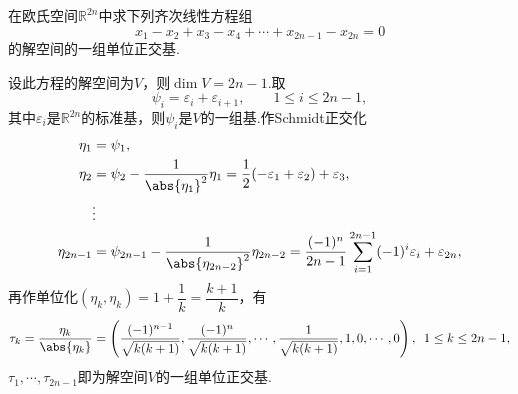 \begin{prob}[25]
	在欧氏空间$\mathbb{R}^{2n}$中求下列齐次线性方程组
	\[
		x_1-x_2+x_3-x_4+\cdots+x_{2n-1}-x_{2n}=0
	\]
	的解空间的一组单位正交基.
\end{prob}
\begin{sol}
	设此方程的解空间为$V$，则$\dim V=2n-1$.取
	\[
		\psi_i=\varepsilon_i+\varepsilon_{i+1},\qquad 1\le i\le 2n-1,
	\]
	其中$\varepsilon_i$是$\mathbb{R}^{2n}$的标准基，则$\psi_i$是$V$的一组基.作Schmidt正交化
	\begin{align*}
		\eta_1      & =\psi_1,                                                                                                                          \\
		\eta_2      & =\psi_2-\frac{1}{\abs{\eta_1}^2}\eta_1=\frac{1}{2}(-\varepsilon_1+\varepsilon_2)+\varepsilon_3,                                   \\
		            & \vdots                                                                                                                            \\
		\eta_{2n-1} & =\psi_{2n-1}-\frac{1}{\abs{\eta_{2n-2}}^2}\eta_{2n-2}=\frac{(-1)^{n}}{2n-1}\sum_{i=1}^{2n-1}(-1)^i\varepsilon_i+\varepsilon_{2n},
	\end{align*}
	再作单位化$(\eta_k,\eta_k)=1+\dfrac{1}{k}=\dfrac{k+1}{k}$，有
	\[
		\tau_k=\frac{\eta_k}{\abs{\eta_k}}=\left(\frac{(-1)^{n-1}}{\sqrt{k(k+1)}},\frac{(-1)^n}{\sqrt{k(k+1)}},\cdots,\frac{1}{\sqrt{k(k+1)}},1,0,\cdots,0\right),\enspace 1\le k\le 2n-1,
	\]
	$\tau_1,\cdots,\tau_{2n-1}$即为解空间$V$的一组单位正交基.
\end{sol}
